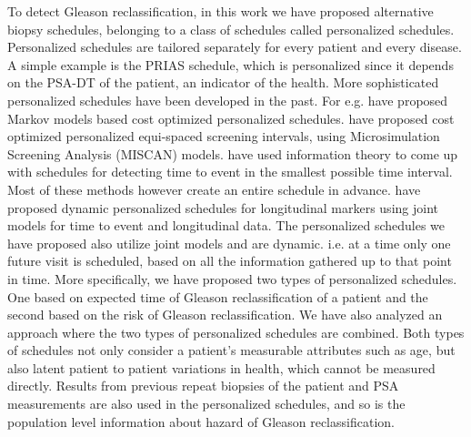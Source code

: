 To detect Gleason reclassification, in this work we have proposed alternative biopsy schedules, belonging to a class of schedules called personalized schedules. Personalized schedules are tailored separately for every patient and every disease. A simple example is the PRIAS schedule, which is personalized since it depends on the PSA-DT of the patient, an indicator of the health. More sophisticated personalized schedules have been developed in the past. For e.g. \cite{bebu2017OptimalScreening} have proposed Markov models based cost optimized personalized schedules. \cite{oMahonyOptimaInterval} have proposed cost optimized personalized equi-spaced screening intervals, using Microsimulation Screening Analysis (MISCAN) models. \cite{parmigiani1998designing} have used information theory to come up with schedules for detecting time to event in the smallest possible time interval. Most of these methods however create an entire schedule in advance. \cite{drizopoulosPersScreening} have proposed dynamic personalized schedules for longitudinal markers using joint models for time to event and longitudinal data\citep{tsiatis2004joint,rizopoulos2012joint}. The personalized schedules we have proposed also utilize joint models and are dynamic. i.e. at a time only one future visit is scheduled, based on all the information gathered up to that point in time. More specifically, we have proposed two types of personalized schedules. One based on expected time of Gleason reclassification of a patient and the second based on the risk of Gleason reclassification. We have also analyzed an approach where the two types of personalized schedules are combined. Both types of schedules not only consider a patient's measurable attributes such as age, but also latent patient to patient variations in health, which cannot be measured directly. Results from previous repeat biopsies of the patient and PSA measurements are also used in the personalized schedules, and so is the population level information about hazard of Gleason reclassification.\\

